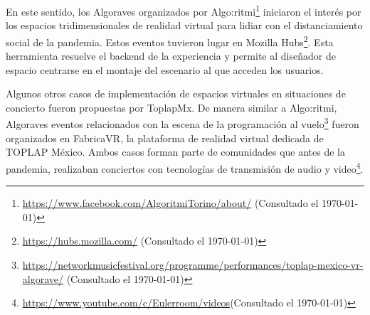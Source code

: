 



 En este sentido, los Algoraves organizados por Algo:ritmi\footnote{\url{https://www.facebook.com/AlgoritmiTorino/about/} (Consultado el \today)} iniciaron el interés por los espacios tridimensionales de realidad virtual para lidiar con el distanciamiento social de la pandemia. Estos eventos tuvieron lugar en Mozilla Hubs\footnote{\url{https://hubs.mozilla.com/} (Consultado el \today)}. Esta herramienta resuelve el backend de la experiencia y permite al diseñador de espacio centrarse en el montaje del escenario al que acceden los usuarios. 

Algunos otros casos de implementación de espacios virtuales en situaciones de concierto fueron propuestas por ToplapMx. De manera similar a Algo:ritmi, Algoraves eventos relacionados con la escena de la programación al vuelo\footnote{\url{https://networkmusicfestival.org/programme/performances/toplap-mexico-vr-algorave/} (Consultado el \today)} fueron organizados en FabricaVR, la plataforma de realidad virtual dedicada de TOPLAP México. Ambos casos forman parte de comunidades que antes de la pandemia, realizaban conciertos con tecnologías de transmisión de audio y video\footnote{\url{https://www.youtube.com/c/Eulerroom/videos}(Consultado el \today)}.%

